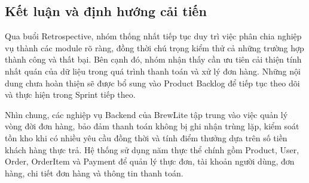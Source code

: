 \subsection{Kết luận và định hướng cải tiến}

Qua buổi Retrospective, nhóm thống nhất tiếp tục duy trì
việc phân chia nghiệp vụ thành các module rõ ràng,
đồng thời chú trọng kiểm thử cả những trường hợp
thành công và thất bại. Bên cạnh đó, nhóm nhận thấy
cần ưu tiên cải thiện tính nhất quán của dữ liệu trong
quá trình thanh toán và xử lý đơn hàng. Những nội dung
chưa hoàn thiện sẽ được bổ sung vào Product Backlog
để tiếp tục theo dõi và thực hiện trong Sprint tiếp theo.

Nhìn chung, các nghiệp vụ Backend của BrewLite tập trung
vào việc quản lý vòng đời đơn hàng, bảo đảm thanh toán
không bị ghi nhận trùng lặp, kiểm soát tồn kho khi có
nhiều yêu cầu đồng thời và tính điểm thưởng dựa trên
số tiền khách hàng thực trả. Hệ thống sử dụng năm thực thể
chính gồm Product, User, Order, OrderItem và Payment
để quản lý thực đơn, tài khoản người dùng, đơn hàng,
chi tiết đơn hàng và thông tin thanh toán.
